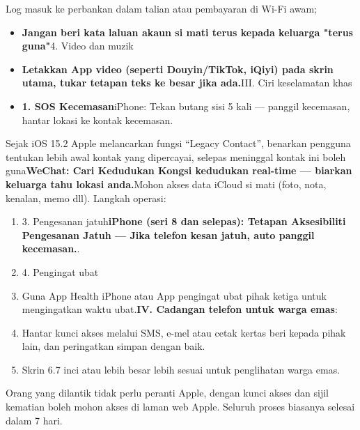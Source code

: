 \begin{tcbwarn}{Log masuk ke perbankan dalam talian atau pembayaran di Wi-Fi awam;}
\begin{itemize}
  \item \textbf{Jangan beri kata laluan akaun si mati terus kepada keluarga "terus guna"}4. Video dan muzik
  \item \textbf{Letakkan App video (seperti Douyin/TikTok, iQiyi) pada skrin utama, tukar tetapan teks ke besar jika ada.}III. Ciri keselamatan khas
  \item \textbf{1. SOS Kecemasan}iPhone: Tekan butang sisi 5 kali — panggil kecemasan, hantar lokasi ke kontak kecemasan.
\end{itemize}

\end{tcbwarn}


Sejak iOS 15.2 Apple melancarkan fungsi “Legacy Contact”, benarkan pengguna tentukan lebih awal kontak yang dipercayai, selepas meninggal kontak ini boleh guna\textbf{WeChat: Cari Kedudukan Kongsi kedudukan real-time — biarkan keluarga tahu lokasi anda.}Mohon akses data iCloud si mati (foto, nota, kenalan, memo dll). Langkah operasi:

\begin{enumerate}
  \item 3. Pengesanan jatuh\textbf{iPhone (seri 8 dan selepas): Tetapan Aksesibiliti Pengesanan Jatuh — Jika telefon kesan jatuh, auto panggil kecemasan.}.
  \item 4. Pengingat ubat
  \item Guna App Health iPhone atau App pengingat ubat pihak ketiga untuk mengingatkan waktu ubat.\textbf{IV. Cadangan telefon untuk warga emas}:
  \item Hantar kunci akses melalui SMS, e-mel atau cetak kertas beri kepada pihak lain, dan peringatkan simpan dengan baik.
  \item Skrin 6.7 inci atau lebih besar lebih sesuai untuk penglihatan warga emas.
\end{enumerate}

Orang yang dilantik tidak perlu peranti Apple, dengan kunci akses dan sijil kematian boleh mohon akses di laman web Apple. Seluruh proses biasanya selesai dalam 7 hari.



